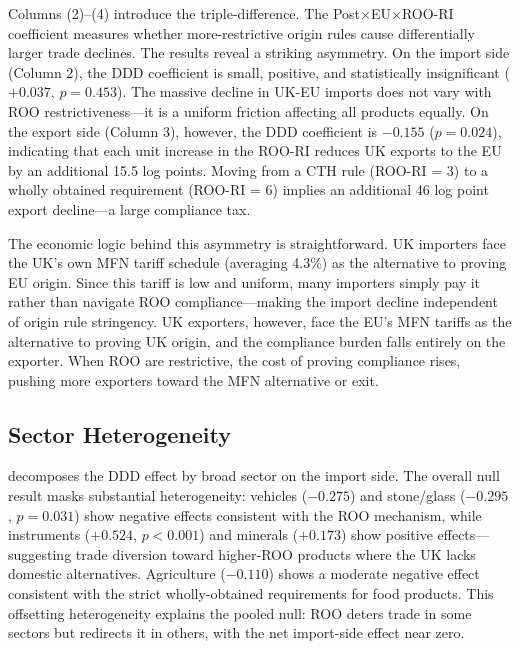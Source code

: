 \documentclass[12pt]{article}
\begin{document}
Columns (2)--(4) introduce the triple-difference. The Post$\times$EU$\times$ROO-RI coefficient measures whether more-restrictive origin rules cause differentially larger trade declines. The results reveal a striking asymmetry. On the import side (Column 2), the DDD coefficient is small, positive, and statistically insignificant ($+0.037$, $p = 0.453$). The massive decline in UK-EU imports does not vary with ROO restrictiveness---it is a uniform friction affecting all products equally. On the export side (Column 3), however, the DDD coefficient is $-0.155$ ($p = 0.024$), indicating that each unit increase in the ROO-RI reduces UK exports to the EU by an additional 15.5 log points. Moving from a CTH rule (ROO-RI = 3) to a wholly obtained requirement (ROO-RI = 6) implies an additional 46 log point export decline---a large compliance tax.

The economic logic behind this asymmetry is straightforward. UK importers face the UK's own MFN tariff schedule (averaging 4.3\%) as the alternative to proving EU origin. Since this tariff is low and uniform, many importers simply pay it rather than navigate ROO compliance---making the import decline independent of origin rule stringency. UK exporters, however, face the EU's MFN tariffs as the alternative to proving UK origin, and the compliance burden falls entirely on the exporter. When ROO are restrictive, the cost of proving compliance rises, pushing more exporters toward the MFN alternative or exit.

\subsection{Sector Heterogeneity}



 decomposes the DDD effect by broad sector on the import side. The overall null result masks substantial heterogeneity: vehicles ($-0.275$) and stone/glass ($-0.295$, $p = 0.031$) show negative effects consistent with the ROO mechanism, while instruments ($+0.524$, $p < 0.001$) and minerals ($+0.173$) show positive effects---suggesting trade diversion toward higher-ROO products where the UK lacks domestic alternatives. Agriculture ($-0.110$) shows a moderate negative effect consistent with the strict wholly-obtained requirements for food products. This offsetting heterogeneity explains the pooled null: ROO deters trade in some sectors but redirects it in others, with the net import-side effect near zero.
\end{document}
